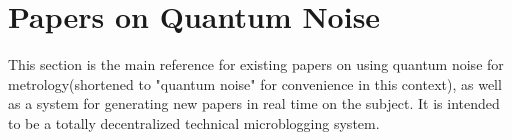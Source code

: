 \documentclass[11pt]{article}
\begin{document}
\section{
Papers on Quantum Noise}



This section is the main reference for existing papers on using quantum noise for metrology(shortened to "quantum noise" for convenience in this context), as well as a system for generating new papers in real time on the subject.  It is intended to be a totally decentralized technical microblogging system.    
\end{document}
